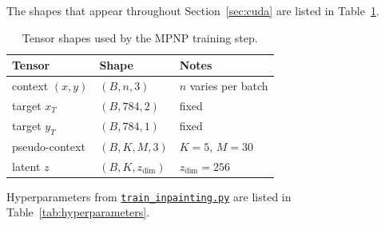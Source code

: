 \documentclass[11pt]{article}
\begin{document}
The shapes that appear throughout Section~\ref{sec:cuda} are listed in
Table~\ref{tab:tensor-shapes}.

\begin{table}[H]
	\centering
	\begin{tabular}{lll}
		\toprule
		Tensor           & Shape                    & Notes                  \\
		\midrule
		context $(x, y)$ & $(B, n, 3)$              & $n$ varies per batch   \\
		target $x_T$     & $(B, 784, 2)$            & fixed                  \\
		target $y_T$     & $(B, 784, 1)$            & fixed                  \\
		pseudo-context   & $(B, K, M, 3)$           & $K{=}5$, $M{=}30$      \\
		latent $z$       & $(B, K, z_{\text{dim}})$ & $z_{\text{dim}}{=}256$ \\
		\bottomrule
	\end{tabular}
	\caption{Tensor shapes used by the MPNP training step.}\label{tab:tensor-shapes}
\end{table}

Hyperparameters from \href{../train_inpainting.py}{\texttt{train\_inpainting.py}}
are listed in Table~\ref{tab:hyperparameters}.
\end{document}
